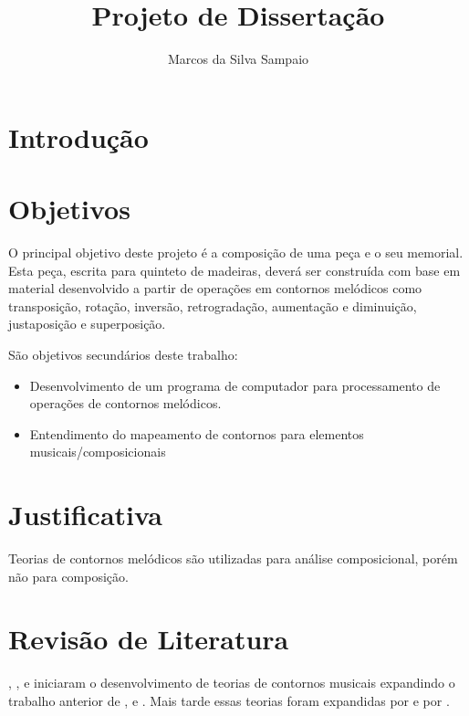 \documentclass{article}
\begin{document}
\title{Projeto de Dissertação}
\author{Marcos da Silva Sampaio}
\maketitle

\thispagestyle{empty}

\setlength{\parindent}{0cm}

\section{Introdução}
\label{sec:introducao}

\section{Objetivos}
\label{sec:objetivos}

O principal objetivo deste projeto é  a composição de uma peça e o seu
memorial.  Esta peça, escrita  para quinteto  de madeiras,  deverá ser
construída com base em material  desenvolvido a partir de operações em
contornos    melódicos   como    transposição,    rotação,   inversão,
retrogradação, aumentação e diminuição, justaposição e superposição.

São objetivos secundários deste trabalho:

\begin{itemize}
\item Desenvolvimento de um programa de computador para processamento
  de operações de contornos melódicos.
\item Entendimento do mapeamento de contornos para elementos
  musicais/composicionais
\end{itemize}

\section{Justificativa}
\label{sec:justificativa}


Teorias de contornos melódicos são utilizadas para análise
composicional, porém não para composição.

\section{Revisão de Literatura}
\label{sec:revis-de-liter}

\cite{friedmann85:_method_discus_contour},
\cite{morris1987cpc}, \cite{marvin87:_relat_music_contour}
e \cite{polansky92:_possib_impos_melod} iniciaram o
desenvolvimento de teorias de contornos musicais expandindo o trabalho
anterior de \cite{seeger1960mml},
\cite{kolinkski65:_struc_melod_movem} e
\cite{adams1976mct}. Mais tarde essas teorias foram expandidas
por \cite{quinn97:_fuzzy_exten_theor_contour} e por
\cite{beard2003cmm}.
\end{document}
